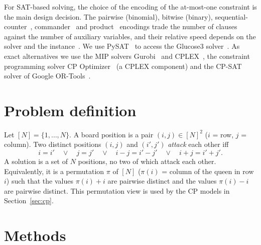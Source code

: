 \documentclass[a4paper,fleqn]{cas-sc}
\begin{document}
For SAT-based solving, the choice of the encoding of the at-most-one constraint is the main design decision.
The pairwise (binomial), bitwise (binary), sequential-counter~\cite{sinz2005towards}, commander~\cite{klieber2007commander} and product~\cite{chen2010product} encodings trade the number of clauses against the number of auxiliary variables, and their relative speed depends on the solver and the instance~\cite{prestwich2009cnf,frisch2010satencodings}.
We use PySAT~\cite{ignatiev2018pysat} to access the Glucose3 solver~\cite{audemard2009glucose}.
As exact alternatives we use the MIP solvers Gurobi~\cite{gurobi} and CPLEX~\cite{cplex}, the constraint programming solver CP Optimizer~\cite{laborie2018cpoptimizer} (a CPLEX component) and the CP-SAT solver of Google OR-Tools~\cite{ortools}.

\FloatBarrier
\section{Problem definition}\label{sec:problem}
Let $[N]=\{1,\dots,N\}$. A board position is a pair $(i,j)\in[N]^2$ ($i$ = row, $j$ = column).
Two distinct positions $(i,j)$ and $(i',j')$ \emph{attack} each other iff
\[
 i=i' \quad\lor\quad j=j' \quad\lor\quad i-j=i'-j' \quad\lor\quad i+j=i'+j'.
\]
A solution is a set of $N$ positions, no two of which attack each other.
Equivalently, it is a permutation $\pi$ of $[N]$ ($\pi(i)$ = column of the queen in row $i$) such that the values $\pi(i)+i$ are pairwise distinct and the values $\pi(i)-i$ are pairwise distinct.
This permutation view is used by the CP models in Section~\ref{sec:cp}.

\FloatBarrier
\section{Methods}\label{sec:methods}
\end{document}
